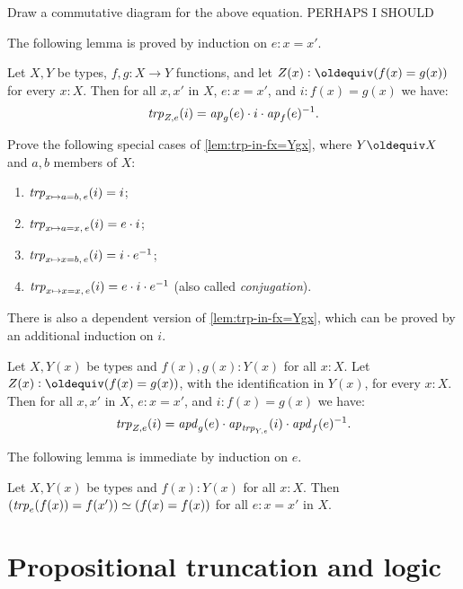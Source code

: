\begin{xca}\label{xca:conjugation}
Draw a commutative diagram for the above equation. PERHAPS I SHOULD
\end{xca}

The following lemma is proved by induction on $e: x=x'$.

\begin{lemma}\label{lem:trp-in-fx=Ygx}
Let $X,Y$ be types, $f,g: X\to Y$ functions, and let
$Z(x)\defeq (f(x)=g(x))$ for every $x:X$. 
Then for all $x,x'$ in $X$, $e: x=x'$, and $i: f(x)=g(x)$ we have:
\[
\mathop{\mathit{trp}_{Z, e}} (i) = \mathop{{\it ap}_{g}}(e) \cdot i \cdot \mathop{{\it ap}_{f}}(e)^{-1}.
\]
\end{lemma}

\begin{xca}\label{xca:trp-in-a/x=b/x}
Prove the following special cases of \cref{lem:trp-in-fx=Ygx},
where $Y\jdeq X$ and $a,b$ members of $X$:
\begin{enumerate}
\item $\mathop{\mathit{trp}_{x\mapsto a=b,\,e}} (i) = i$;
\item\label{xca-trp-in-a=x} $\mathop{\mathit{trp}_{x\mapsto a=x,\,e}} (i) = e\cdot i$;
\item $\mathop{\mathit{trp}_{x\mapsto x=b,\,e}} (i) = i \cdot e^{-1}$;
\item $\mathop{\mathit{trp}_{x\mapsto x=x,\,e}} (i) = e \cdot i\cdot e^{-1}$ 
(also called \emph{conjugation}).
\end{enumerate}
\end{xca}

There is also a dependent version of \cref{lem:trp-in-fx=Ygx},
which can be proved by an additional induction on $i$.

\begin{lemma}\label{lem:trp-in-fx=Yxgx}
Let $X,Y(x)$ be types and $f(x),g(x): Y(x)$ for all $x:X$. 
Let $Z(x)\defeq (f(x)=g(x))$,
with the identification in $Y(x)$, for every $x:X$. 
Then for all $x,x'$ in $X$, $e: x=x'$, and $i: f(x)=g(x)$ we have:
\[
\mathop{\mathit{trp}_{Z, e}} (i) = \mathop{{\it apd}_{g}}(e) \cdot \mathop{{\it ap}_{\mathop{\mathit{trp}_{Y,e}}}}(i) \cdot \mathop{{\it apd}_{f}}(e)^{-1}.
\]
\end{lemma}

The following lemma is immediate by induction on $e$.

\begin{lemma}\label{lem:Dan's-lemma}
Let $X,Y(x)$ be types and $f(x): Y(x)$ for all $x:X$.
Then $(\mathop{\mathit{trp}_{e}}(f(x))=f(x')) \simeq (f(x)=f(x))$ for all $e: x=x'$ in $X$.
\end{lemma}


\section{Propositional truncation and logic}
\label{sec:prop-trunc}

